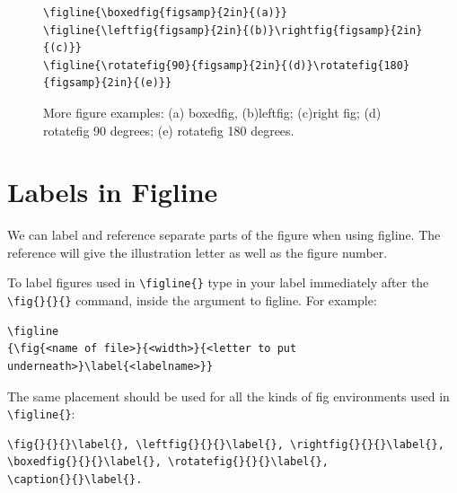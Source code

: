 \documentclass[preprint]{JASA}
\begin{document}
\begin{figure}
\baselineskip=12pt
\begin{verbatim}
\figline{\boxedfig{figsamp}{2in}{(a)}}
\figline{\leftfig{figsamp}{2in}{(b)}\rightfig{figsamp}{2in}{(c)}}
\figline{\rotatefig{90}{figsamp}{2in}{(d)}\rotatefig{180}{figsamp}{2in}{(e)}}
\end{verbatim}




\caption{More figure examples: (a) boxedfig, 
(b)leftfig; (c)right fig; (d) rotatefig 90 degrees;
(e) rotatefig 180 degrees. }

\end{figure}

\clearpage
\section{Labels in Figline}
We can label and
reference separate parts of the figure when using figline.
The reference will give the illustration letter as well as the figure
number.

To label figures used in \verb+\figline{}+ type in your
label immediately after the \verb+\fig{}{}{}+ command, inside the
argument to figline. For example:

\begin{verbatim}
\figline
{\fig{<name of file>}{<width>}{<letter to put underneath>}\label{<labelname>}}
\end{verbatim}

The same placement should be used for all the kinds of fig
environments used in \verb+\figline{}+:
\begin{verbatim}
\fig{}{}{}\label{}, \leftfig{}{}{}\label{}, \rightfig{}{}{}\label{}, 
\boxedfig{}{}{}\label{}, \rotatefig{}{}{}\label{},
\caption{}{}\label{}. 
\end{verbatim}
\clearpage
\end{document}
